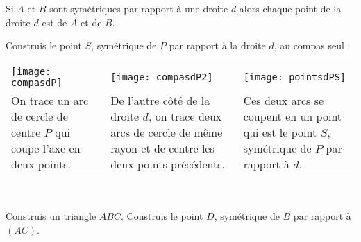 \begin{methode*1}

\begin{aconnaitre}
Si $A$ et $B$ sont symétriques par rapport à une droite $d$ alors chaque point de la droite $d$ est  de $A$ et de $B$. 
\end{aconnaitre}

\begin{exemple*1}
Construis le point $S$, symétrique de $P$ par rapport à la droite $d$, au compas seul : \\[0.5em]
\begin{tabularx}{\textwidth}{X|X|X}
 \texttt{[image: compasdP]} &  \texttt{[image: compasdP2]} & \texttt{[image: pointsdPS]} \\ 
 On trace un arc de cercle de centre $P$ qui coupe l'axe en deux points. & De l'autre côté de la droite $d$, on trace deux arcs de cercle de même rayon et de centre les deux points précédents. & Ces deux arcs se coupent en un point qui est le point $S$, symétrique de $P$ par rapport à $d$. \\
\end{tabularx} \\
 \end{exemple*1}


\exercice
Construis un triangle $ABC$. Construis le point $D$, symétrique de $B$ par rapport à $(AC)$.
 
\end{methode*1}



